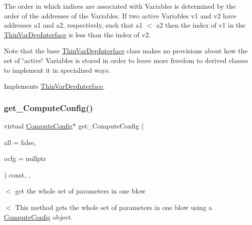 The order in which indices are associated with Variables is determined by the order of the addresses of the Variables. If two active Variables v1 and v2 have addresses a1 and a2, respectively, such that a1 $<$ a2 then the index of v1 in the \mbox{\hyperlink{class_s_m_spp__di__unipi__it_1_1_thin_var_dep_interface}{Thin\+Var\+Dep\+Interface}} is less than the index of v2.

Note that the base \mbox{\hyperlink{class_s_m_spp__di__unipi__it_1_1_thin_var_dep_interface}{Thin\+Var\+Dep\+Interface}} class makes no provisions about how the set of \char`\"{}active\char`\"{} Variables is stored in order to leave more freedom to derived classes to implement it in specialized ways. 

Implements \mbox{\hyperlink{group___thin_var_dep_interface___c_l_a_s_s_e_s_ga1967518603f9424434460d4ba8676c37}{Thin\+Var\+Dep\+Interface}}.

\mbox{\label{class_s_m_spp__di__unipi__it_1_1_f_row_constraint_af420d3dff49afbccc8a0c2de86374eeb}} 
\subsubsection{\texorpdfstring{get\+\_\+\+Compute\+Config()}{get\_ComputeConfig()}}
{\footnotesize\ttfamily virtual \mbox{\hyperlink{class_s_m_spp__di__unipi__it_1_1_compute_config}{Compute\+Config}}$\ast$ get\+\_\+\+Compute\+Config (\begin{DoxyParamCaption}\item[{bool}]{all = {\ttfamily false},  }\item[{\mbox{\hyperlink{class_s_m_spp__di__unipi__it_1_1_compute_config}{Compute\+Config}} $\ast$}]{ocfg = {\ttfamily nullptr} }\end{DoxyParamCaption}) const\hspace{0.3cm}{\ttfamily [inline]}, {\ttfamily [override]}, {\ttfamily [virtual]}}



$<$ get the whole set of parameters in one blow 

$<$ This method gets the whole set of parameters in one blow using a \mbox{\hyperlink{class_s_m_spp__di__unipi__it_1_1_compute_config}{Compute\+Config}} object.

